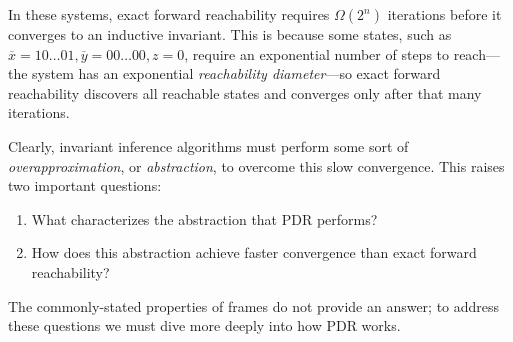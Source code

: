 \documentclass[acmsmall,screen]{acmart}
\newcommand{\ov}{\overline}
\renewcommand{\vec}{\ov}
\begin{document}
In these systems, exact forward reachability requires $\Omega\left(2^n\right)$ iterations before it converges to an inductive invariant. This is because some states, such as $\vec{x}=10\ldots 01, \vec{y}=00 \ldots 00,z=0$, require an exponential number of steps to reach---the system has an exponential \emph{reachability diameter}---so exact forward reachability discovers all reachable states and converges only after that many iterations.
%

Clearly, invariant inference algorithms must perform some sort of \emph{overapproximation}, or \emph{abstraction}, to overcome this slow convergence. %
%
This raises two important questions:
\begin{enumerate}
	\item \label{it:q-abstraction} What characterizes the abstraction that PDR performs? %
	\item \label{it:q-convergence} How does this abstraction achieve faster convergence than exact forward reachability? %
\end{enumerate}
The commonly-stated properties of frames do not provide an answer; to address these questions we must dive more deeply into how PDR works.

%
%

%
%
%
%
%
%
%
%
%
\end{document}
